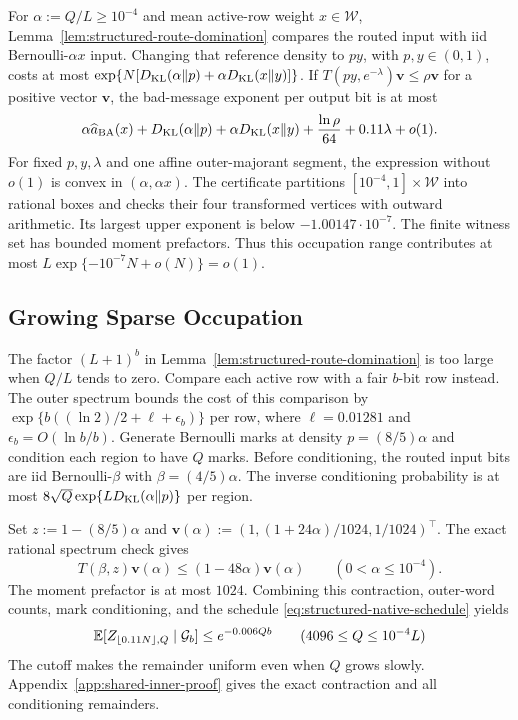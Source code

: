 For $\alpha:=Q/L\ge10^{-4}$ and mean active-row weight $x\in\mathcal W$,
Lemma~\ref{lem:structured-route-domination} compares the routed input
with iid Bernoulli-$\alpha x$ input. Changing that reference density to
$py$, with $p,y\in(0,1)$, costs at most
$\exp\{N[D_{\rm KL}(\alpha\Vert p)+\alpha D_{\rm KL}(x\Vert y)]\}$.
If $T(py,e^{-\lambda})\boldsymbol v\le\rho\boldsymbol v$ for a
positive vector $\boldsymbol v$, the bad-message exponent per output
bit is at most
\begin{equation}
 \alpha\widehat a_{\rm BA}(x)
 +D_{\rm KL}(\alpha\Vert p)+\alpha D_{\rm KL}(x\Vert y)
 +\frac{\ln\rho}{64}+0.11\lambda+o(1).
 \label{eq:shared-dense-exponent}
\end{equation}
For fixed $p,y,\lambda$ and one affine outer-majorant segment, the
expression without $o(1)$ is convex in $(\alpha,\alpha x)$.
The certificate partitions $[10^{-4},1]\times\mathcal W$ into rational
boxes and checks their four transformed vertices with outward arithmetic.
Its largest upper exponent is below $-1.00147\cdot10^{-7}$.
The finite witness set has bounded moment prefactors. Thus this
occupation range contributes at most
$L\exp\{-10^{-7}N+o(N)\}=o(1)$.

\subsection{Growing Sparse Occupation}

The factor $(L+1)^b$ in Lemma~\ref{lem:structured-route-domination} is
too large when $Q/L$ tends to zero. Compare each active row with a fair
$b$-bit row instead. The outer spectrum bounds the cost of this
comparison by $\exp\{b((\ln2)/2+\ell+\epsilon_b)\}$ per row, where
$\ell=0.01281$ and $\epsilon_b=O(\ln b/b)$.
Generate Bernoulli marks at density $p=(8/5)\alpha$ and condition each
region to have $Q$ marks. Before conditioning, the routed input bits
are iid Bernoulli-$\beta$ with $\beta=(4/5)\alpha$. The inverse
conditioning probability is at most
$8\sqrt Q\exp\{L D_{\rm KL}(\alpha\Vert p)\}$ per region.

Set $z:=1-(8/5)\alpha$ and
$\boldsymbol v(\alpha):=(1,(1+24\alpha)/1024,1/1024)^\top$.
The exact rational spectrum check gives
\begin{equation}
 T(\beta,z)\boldsymbol v(\alpha)
 \le(1-48\alpha)\boldsymbol v(\alpha)
 \qquad(0<\alpha\le10^{-4}).
 \label{eq:shared-sparse-collatz}
\end{equation}
The moment prefactor is at most $1024$. Combining this contraction,
outer-word counts, mark conditioning, and the schedule
\eqref{eq:structured-native-schedule} yields
\begin{equation}
 \mathbb E[Z_{\lfloor0.11N\rfloor,Q}\mid\mathcal G_b]
 \le e^{-0.006Qb}
 \qquad(4096\le Q\le10^{-4}L)
 \label{eq:shared-sparse-final}
\end{equation}
The cutoff makes the remainder uniform even when $Q$ grows slowly.
Appendix~\ref{app:shared-inner-proof} gives the exact contraction and
all conditioning remainders.

